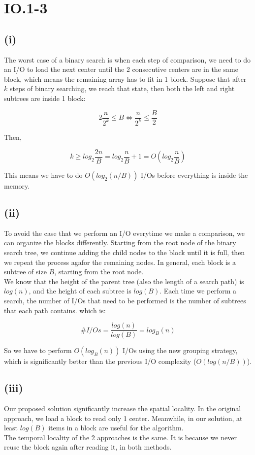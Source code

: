 \section*{IO.1-3}
\subsection*{(i)}
The worst case of a binary search is when each step of comparison, we need to do an I/O to load the next center until the 2 consecutive centers are in the same block, which means the remaining array has to fit in 1 block. Suppose that after $k$ steps of binary searching, we reach that state, then both the left and right subtrees are inside 1 block:

$$2 \frac{n}{2^k} \leq B \iff \frac{n}{2^k} \leq \frac{B}{2}$$

Then,

$$k \geq log_2 \frac{2n}{B} = log_2 \frac{n}{B} + 1 = O(log_2 \frac{n}{B}) $$

This means we have to do $O(log_2(n / B))$ I/Os before everything is inside the memory.

\subsection*{(ii)}
To avoid the case that we perform an I/O everytime we make a comparison, we can organize the blocks differently. Starting from the root node of the binary search tree, we continue adding the child nodes to the block until it is full, then we repeat the process agafor the remaining nodes. In general, each block is a subtree of size $B$, starting from the root node.\\

We know that the height of the parent tree (also the length of a search path) is $log(n)$, and the height of each subtree is $log(B)$. Each time we perform a search, the number of I/Os that need to be performed is the number of subtrees that each path contains. which is:

$$\#I/Os = \frac{log(n)}{log(B)} = log_B (n)$$

So we have to perform $O(log_B (n))$ I/Os using the new grouping strategy, which is significantly better than the previous I/O complexity ($O(log(n/B))$).

\subsection*{(iii)}
Our proposed solution significantly increase the spatial locality. In the original approach, we load a block to read only 1 center. Meanwhile, in our solution, at least $log(B)$ items in a block are useful for the algorithm.\\

The temporal locality of the 2 approaches is the same. It is because we never reuse the block again after reading it, in both methods.
